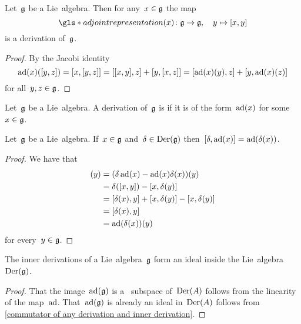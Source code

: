 \begin{lemma}
\label{lie algebras act adjoint by derivations}
  Let~$\mathfrak{g}$ be a Lie~algebra.
  Then for any~$x \in \mathfrak{g}$ the map
  \[
    \gls*{adjoint representation}(x)
    \colon
    \glie
    \to
    \glie,
    \quad
    y
    \mapsto
    [x,y]
  \]
  is a derivation of~$\mathfrak{g}$.
\end{lemma}


\begin{proof}
  By the Jacobi identity
  \[
    \operatorname{ad}(x)([y,z])
    =
    [x,[y,z]]
    =
    [[x,y],z] + [y,[x,z]] \\
    =
    [\operatorname{ad}(x)(y), z] + [y, \operatorname{ad}(x)(z)]
  \]
  for all~$y,z \in \mathfrak{g}$.
\end{proof}


\begin{definition}
 Let~$\mathfrak{g}$ be a Lie~algebra.
 A derivation of~$\mathfrak{g}$ is  if it is of the form~$\operatorname{ad}(x)$ for some~$x \in \mathfrak{g}$.
\end{definition}


\begin{lemma}
  \label{commutator of any derivation and inner derivation}
  Let~$\mathfrak{g}$ be a Lie~algebra.
  If~$x \in \mathfrak{g}$ and~$\delta \in \operatorname{Der}(\mathfrak{g})$ then~$[\delta, \operatorname{ad}(x)] = \operatorname{ad}(\delta(x))$.
\end{lemma}


\begin{proof}
 We have that
 \begin{align*}
  [\delta, \ad(x)](y)
  &= 
  (\delta \ad(x) - \ad(x) \delta(x))(y)
  \\
  &=
  \delta([x,y]) - [x,\delta(y)]
  \\
  &=
  [\delta(x),y] + [x,\delta(y)] - [x,\delta(y)]
  \\
  &=
  [\delta(x),y]
  \\
  &=
  \ad(\delta(x))(y)
 \end{align*}
 for every~$y \in \mathfrak{g}$.
\end{proof}


\begin{corollary}
  \label{inner derivations are an ideal}
  The inner derivations of a Lie~algebra~$\mathfrak{g}$ form an ideal inside the Lie~algebra~$\operatorname{Der}(\mathfrak{g})$.
\end{corollary}

\begin{proof}
  That the image~$\operatorname{ad}(\mathfrak{g})$ is a~{\linear{$\kf$}} subspace of~$\operatorname{Der}(A)$ follows from the linearity of the map~$\operatorname{ad}$.
  That~$\operatorname{ad}(\mathfrak{g})$ is already an ideal in~$\operatorname{Der}(A)$ follows from \cref{commutator of any derivation and inner derivation}.
\end{proof}







